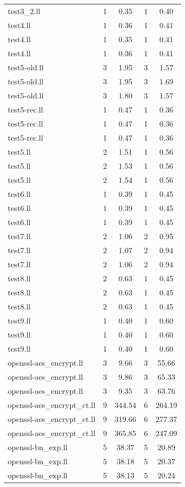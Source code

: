 \begin{tabular}{l|c|c|c|c|}
test3\_2.ll & 1 & 0.35 & 1 & 0.40\\
test4.ll & 1 & 0.36 & 1 & 0.41\\
test4.ll & 1 & 0.35 & 1 & 0.41\\
test4.ll & 1 & 0.36 & 1 & 0.41\\
test5-old.ll & 3 & 1.95 & 3 & 1.57\\
test5-old.ll & 3 & 1.95 & 3 & 1.69\\
test5-old.ll & 3 & 1.80 & 3 & 1.57\\
test5-rec.ll & 1 & 0.47 & 1 & 0.36\\
test5-rec.ll & 1 & 0.47 & 1 & 0.36\\
test5-rec.ll & 1 & 0.47 & 1 & 0.36\\
test5.ll & 2 & 1.51 & 1 & 0.56\\
test5.ll & 2 & 1.53 & 1 & 0.56\\
test5.ll & 2 & 1.54 & 1 & 0.56\\
test6.ll & 1 & 0.39 & 1 & 0.45\\
test6.ll & 1 & 0.39 & 1 & 0.45\\
test6.ll & 1 & 0.39 & 1 & 0.45\\
test7.ll & 2 & 1.06 & 2 & 0.95\\
test7.ll & 2 & 1.07 & 2 & 0.94\\
test7.ll & 2 & 1.06 & 2 & 0.94\\
test8.ll & 2 & 0.63 & 1 & 0.45\\
test8.ll & 2 & 0.63 & 1 & 0.45\\
test8.ll & 2 & 0.63 & 1 & 0.45\\
test9.ll & 1 & 0.40 & 1 & 0.60\\
test9.ll & 1 & 0.40 & 1 & 0.60\\
test9.ll & 1 & 0.40 & 1 & 0.60\\
\midrule
openssl-aes\_encrypt.ll & 3 & 9.66 & 3 & 55.66\\
openssl-aes\_encrypt.ll & 3 & 9.86 & 3 & 65.33\\
openssl-aes\_encrypt.ll & 3 & 9.35 & 3 & 63.76\\
openssl-aes\_encrypt\_ct.ll & 9 & 344.54 & 6 & 264.19\\
openssl-aes\_encrypt\_ct.ll & 9 & 319.66 & 6 & 277.37\\
openssl-aes\_encrypt\_ct.ll & 9 & 365.85 & 6 & 247.09\\
openssl-bn\_exp.ll & 5 & 38.37 & 5 & 20.89\\
openssl-bn\_exp.ll & 5 & 38.18 & 5 & 20.37\\
openssl-bn\_exp.ll & 5 & 38.13 & 5 & 20.24\\

\end{tabular}

